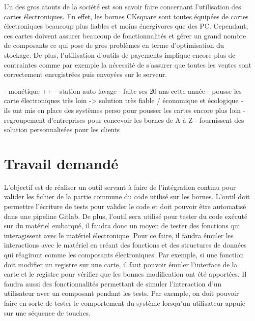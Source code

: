\documentclass[a4paper]{article}
\begin{document}
Un des gros atouts de la société est son savoir faire concernant l'utilisation
des cartes électroniques. En effet, les bornes CKsquare sont toutes équipées de
cartes électroniques beaucoup plus fiables et moins énergivores que des PC.
Cependant, ces cartes doivent assurer beaucoup de fonctionnalités et gérer un
grand nombre de composants ce qui pose de gros problèmes en terme d'optimisation
du stockage. De plus, l'utilisation d'outils de payements implique encore plus
de contraintes comme par exemple la nécessité de s'assurer que toutes les ventes
sont correctement enregistrées puis envoyées sur le serveur.

- monétique ++
- station auto lavage
- faite ses 20 ans cette année
- pousse les carte électroniques très loin -> solution très fiable / économique
  et écologique
- ils ont mis en place des systèmes perso pour pousser les cartes encore plus
  loin
- regroupement d'entreprises pour concevoir les bornes de A à Z
- fournissent des solution personnalisées pour les clients

\section{Travail demandé}

L'objectif est de réaliser un outil servant à faire de l'intégration continu
pour valider les fichier de la partie commune du code utilisé sur les bornes.
L'outil doit permettre l'écriture de tests pour valider le code et doit pouvoir
être automatisé dans une pipeline Gitlab. De plus, l'outil sera utilisé pour
tester du code exécuté sur du matériel embarqué, il faudra donc un moyen de
tester des fonctions qui interagissent avec le matériel électronique. Pour ce
faire, il faudra émuler les interactions avec le matériel en créant des
fonctions et des structures de données qui réagiront comme les composants
électroniques. Par exemple, si une fonction doit modifier un registre sur une
carte, il faut pouvoir émuler l'interface de la carte et le registre pour
vérifier que les bonnes modification ont été apportées. Il faudra aussi des
fonctionnalités permettant de simuler l'interaction d'un utilisateur avec un
composant pendant les tests. Par exemple, on doit pouvoir faire en sorte de
tester le comportement du système lorsqu'un utilisateur appuie sur une séquence
de touches.
\end{document}
